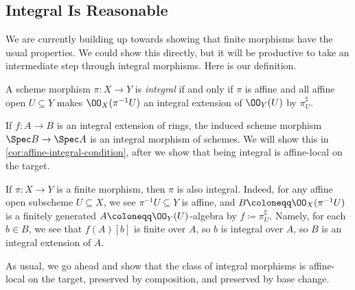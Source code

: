 \documentclass[../notes.tex]{subfiles}
\begin{document}

\subsection{Integral Is Reasonable}
We are currently building up towards showing that finite morphisms have the usual properties. We could show this directly, but it will be productive to take an intermediate step through integral morphisms. Here is our definition.
\begin{definition}
	A scheme morphism $\pi\colon X\to Y$ is \textit{integral} if and only if $\pi$ is affine and all affine open $U\subseteq Y$ makes $\OO_X(\pi^{-1}U)$ an integral extension of $\OO_Y(U)$ by $\pi^\sharp_U$.
\end{definition}
\begin{example}
	If $f\colon A\to B$ is an integral extension of rings, the induced scheme morphism $\Spec B\to\Spec A$ is an integral morphism of schemes. We will show this in \autoref{cor:affine-integral-condition}, after we show that being integral is affine-local on the target.
\end{example}
\begin{example} \label{ex:finite-is-integral}
	If $\pi\colon X\to Y$ is a finite morphism, then $\pi$ is also integral. Indeed, for any affine open subscheme $U\subseteq X$, we see $\pi^{-1}U\subseteq Y$ is affine, and $B\coloneqq\OO_X(\pi^{-1}U)$ is a finitely generated $A\coloneqq\OO_Y(U)$-algebra by $f\coloneqq\pi^\sharp_U$. Namely, for each $b\in B$, we see that $f(A)[b]$ is finite over $A$, so $b$ is integral over $A$, so $B$ is an integral extension of $A$.
\end{example}
As usual, we go ahead and show that the class of integral morphisms is affine-local on the target, preserved by composition, and preserved by base change.
\end{document}
